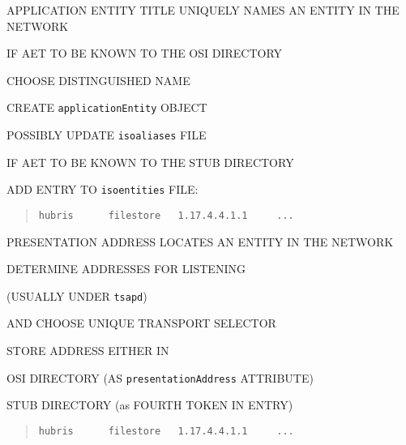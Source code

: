 \begin{bwslide}

\begin{nrtc}
\item	APPLICATION ENTITY TITLE UNIQUELY NAMES AN ENTITY IN THE NETWORK

\item	IF AET TO BE KNOWN TO THE OSI DIRECTORY
    \begin{nrtc}
    \item	CHOOSE DISTINGUISHED NAME

    \item	CREATE \verb"applicationEntity" OBJECT

    \item	POSSIBLY UPDATE \verb"isoaliases" FILE
    \end{nrtc}

\item	IF AET TO BE KNOWN TO THE STUB DIRECTORY
    \begin{nrtc}
    \item	ADD ENTRY TO \verb"isoentities" FILE:
    \end{nrtc}
\begin{quote}\small\begin{verbatim}
hubris      filestore   1.17.4.4.1.1     ...
\end{verbatim}\end{quote}
\end{nrtc}
\end{bwslide}


\begin{bwslide}

\begin{nrtc}
\item	PRESENTATION ADDRESS LOCATES AN ENTITY IN THE NETWORK

\item	DETERMINE ADDRESSES FOR LISTENING
    \begin{nrtc}
    \item	(USUALLY UNDER \verb"tsapd")
    \end{nrtc}
    AND CHOOSE UNIQUE TRANSPORT SELECTOR

\item	STORE ADDRESS EITHER IN
    \begin{nrtc}
    \item	OSI DIRECTORY (AS \verb"presentationAddress" ATTRIBUTE)

    \item	STUB DIRECTORY (as FOURTH TOKEN IN ENTRY)
\begin{quote}\small\begin{verbatim}
hubris      filestore   1.17.4.4.1.1     ...
\end{verbatim}\end{quote}
    \end{nrtc}
\end{nrtc}
\end{bwslide}


